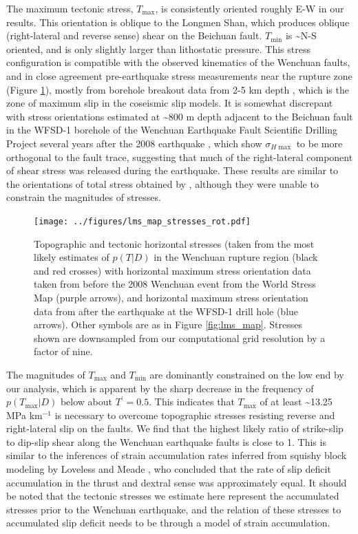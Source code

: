 \documentclass[twocolumn,jgrga]{AGUTeX}
\begin{document}
\begin{article}
The maximum tectonic stress, $T_{\mathrm{max}}$, is consistently
oriented roughly E-W in our results. This orientation is oblique to the
Longmen Shan, which produces oblique (right-lateral and reverse sense)
shear on the Beichuan fault. $T_{\mathrm{min}}$ is \textasciitilde{}N-S
oriented, and is only slightly larger than lithostatic pressure. This
stress configuration is compatible with the observed kinematics of the
Wenchuan faults, and in close agreement pre-earthquake stress
measurements near the rupture zone (Figure \ref{fig:lms_stress_map}),
mostly from borehole breakout data from 2-5 km depth
\citep{heidbach2009}, which is the zone of maximum slip in the coseismic
slip models. It is somewhat discrepant with stress orientations
estimated at \textasciitilde{}800 m depth adjacent to the Beichuan fault
in the WFSD-1 borehole of the Wenchuan Earthquake Fault Scientific
Drilling Project several years after the 2008 earthquake \citep{cui2014},
which show $\sigma_{H{\mathrm{\max}}}$ to be more orthogonal to the fault
trace, suggesting that much of the right-lateral component of shear
stress was released during the earthquake. These results are similar to
the orientations of total stress obtained by 
\citet{medinaluna2013}, although they were unable to constrain the
magnitudes of stresses.

\begin{figure}[t]
\centering
\texttt{[image: ../figures/lms\_map\_stresses\_rot.pdf]}
\caption{Topographic and tectonic horizontal stresses (taken from the
most likely estimates of $p(T|D)$ in the Wenchuan rupture region (black
and red crosses) with horizontal maximum stress orientation data taken
from before the 2008 Wenchuan event from the World Stress Map
\citep{heidbach2009} (purple arrows), and horizontal maximum stress
orientation data from after the earthquake at the WFSD-1 drill hole
\citep{cui2014} (blue arrows). Other symbols are as in Figure
\ref{fig:lms_map}. Stresses shown are downsampled from our computational 
grid resolution by a factor of nine.}
\label{fig:lms_stress_map}
\end{figure}

The magnitudes of $T_{\mathrm{max}}$ and $T_{\mathrm{min}}$ are
dominantly constrained on the low end by our analysis, which is apparent
by the sharp decrease in the frequency of $p(T_{\mathrm{max}}|D)$ below
about $T^\prime = 0.5$. This indicates that $T_{\mathrm{max}}$ of at
least \textasciitilde{}13.25 MPa km$^{-1}$ is necessary to overcome
topographic stresses resisting reverse and right-lateral slip on the
faults. We find that the highest likely ratio of strike-slip to dip-slip
shear along the Wenchuan earthquake faults is close to 1. This is
similar to the inferences of strain accumulation rates inferred from
squishy block modeling by Loveless and Meade \citet{loveless2011}, who
concluded that the rate of slip deficit accumulation in the thrust and
dextral sense was approximately equal. It should be noted that the
tectonic stresses we estimate here represent the accumulated stresses
prior to the Wenchuan earthquake, and the relation of these stresses to
accumulated slip deficit needs to be through a model of strain
accumulation.


\end{article}
\end{document}
